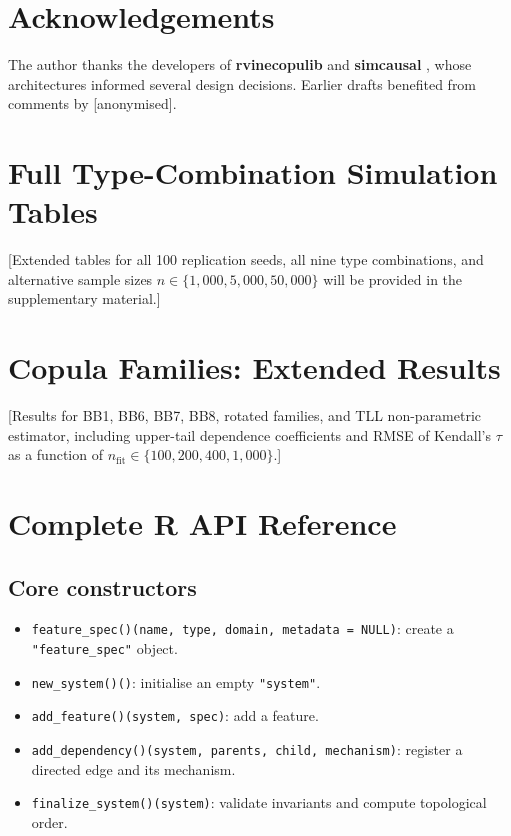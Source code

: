 \documentclass[12pt,a4paper]{article}
\newcommand{\pkg}[1]{\textbf{#1}}
\newcommand{\code}[1]{\texttt{#1}}
\newcommand{\proglang}[1]{\textsf{#1}}
\newcommand{\class}[1]{\mbox{\texttt{"#1"}}}
\newcommand{\fct}[1]{\mbox{\texttt{#1()}}}
\begin{document}
\section*{Acknowledgements}
The author thanks the developers of \pkg{rvinecopulib} \citep{nagler2022rvinecopulib}
and \pkg{simcausal} \citep{sofrygin2017simcausal}, whose architectures informed
several design decisions. Earlier drafts benefited from comments by [anonymised].




\appendix

\section{Full Type-Combination Simulation Tables}
\label{app:type_sims}

[Extended tables for all 100 replication seeds, all nine type combinations,
and alternative sample sizes $n \in \{1{,}000, 5{,}000, 50{,}000\}$ will be
provided in the supplementary material.]

\section{Copula Families: Extended Results}
\label{app:copula_sims}

[Results for BB1, BB6, BB7, BB8, rotated families, and TLL non-parametric
estimator, including upper-tail dependence coefficients and RMSE of Kendall's
$\tau$ as a function of $n_\text{fit} \in \{100, 200, 400, 1{,}000\}$.]

\section{Complete \proglang{R} API Reference}
\label{app:api}

\subsection{Core constructors}
\begin{itemize}[leftmargin=2em]
  \item \fct{feature\_spec}\code{(name, type, domain, metadata = NULL)}: create a
        \class{feature\_spec} object.
  \item \fct{new\_system}\code{()}: initialise an empty \class{system}.
  \item \fct{add\_feature}\code{(system, spec)}: add a feature.
  \item \fct{add\_dependency}\code{(system, parents, child, mechanism)}: register
        a directed edge and its mechanism.
  \item \fct{finalize\_system}\code{(system)}: validate invariants and compute
        topological order.
\end{itemize}
\end{document}
